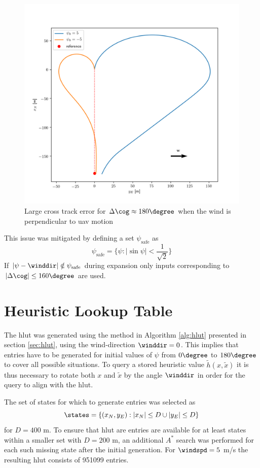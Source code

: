 \begin{figure}
    \begin{center}
        \includegraphics[width=.7\linewidth]{fig/prim_diff_hdg}        
    \end{center}
    \caption{Large cross track error for $\Delta\cog\approx180\degree$ when the wind is perpendicular to \ac{uav} motion}
    \label{fig:hdg_diff_wind}
\end{figure}

This issue was mitigated by defining a set $\psi_{\text{safe}}$ as 
\begin{equation}
    \psi_{\text{safe}}=\{\psi: |\sin\psi|<\frac{1}{\sqrt{2}}\}
\end{equation}
If $|\psi-\winddir|\notin\psi_{\text{safe}}$ during expansion only inputs corresponding to $|\Delta\cog|\leq160\degree$ are used.

\section{Heuristic Lookup Table}
The \ac{hlut} was generated using the method in Algorithm \ref{alg:hlut} presented in section \ref{sec:hlut}, using the wind-direction $\winddir=0$. This implies that 
entries have to be generated for initial values of $\psi$ from $0\degree$ to $180\degree$ to cover all possible situations. To query a stored heuristic value $\tilde{h}(x, \tilde{x})$ it is 
thus necessary to rotate both $x$ and $\tilde{x}$ by the angle $\winddir$ in order for the query to align with the \ac{hlut}. 

The set of states for which to generate entries was selected as 
\begin{equation}
    \states=\{(x_N,y_E): |x_N|\leq D \cup |y_E| \leq D\}
\end{equation}
for $D=400$ m. To ensure that \ac{hlut} are entries are available for at least states within a smaller set with $D=200$ m, an additional 
$A^*$ search was performed for each such missing state after the initial generation. For $\windspd=5$ m/s the resulting \ac{hlut} consists of 951099 entries.

